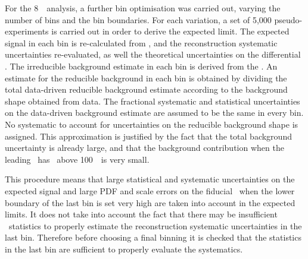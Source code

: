 For the 8~\tev\ analysis, a further bin optimisation was carried out, varying
the number of bins and the bin boundaries. For each variation, a set of 5,000
pseudo-experiments is carried out in order to derive the expected limit. The
expected signal in each bin is re-calculated from \mc, and the reconstruction
systematic uncertainties re-evaluated, as well the theoretical uncertainties on
the differential \cx. The irreducible background estimate in each bin is derived from the
\mc. An estimate for the reducible background in each bin is obtained by dividing the total
data-driven reducible background estimate according to the background shape obtained from data. The
fractional systematic and statistical uncertainties on the data-driven background
estimate are assumed to be the same in every bin. No systematic to
account for uncertainties on the reducible background shape is assigned. This
approximation is justified by the fact that the total background uncertainty is
already large, and that the background contribution when the leading \Z\ has
\pt\ above 100~\gev\ is very small.

This procedure means that large statistical and systematic uncertainties on the
expected signal and large PDF and scale errors on the fiducial \cx\ when the
lower boundary of the last bin is set very high are taken into account in the
expected limits. It does not take into account the fact that there may be
insufficient \mc\ statistics to properly estimate the reconstruction systematic
uncertainties in the last bin. Therefore before choosing a final binning it is
checked that the statistics in the last bin are sufficient to properly evaluate
the systematics.

